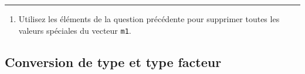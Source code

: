 \documentclass[12pt,twosided, notitlepage]{book}
\newenvironment{Shaded}{}{}
\newcommand{\KeywordTok}[1]{\textcolor[rgb]{0.00,0.00,1.00}{{#1}}}
\newcommand{\StringTok}[1]{\textcolor[rgb]{0.00,0.50,0.50}{{#1}}}
\newcommand{\CommentTok}[1]{\textcolor[rgb]{0.00,0.50,0.00}{{#1}}}
\newcommand{\NormalTok}[1]{{#1}}
\providecommand{\tightlist}{%
  \setlength{\itemsep}{0pt}\setlength{\parskip}{0pt}}
\newif \ifsol
\renewenvironment{Shaded}{\begin{snugshade}}{\end{snugshade}}
\begin{document}
\begin{center} \rule{0.5\linewidth}{\linethickness}\end{center}

\bigskip  \fi 

\begin{enumerate}
\def\labelenumi{\alph{enumi}.}
\setcounter{enumi}{1}
\tightlist
\item
  Utilisez les éléments de la question précédente pour supprimer toutes
  les valeurs spéciales du vecteur
  \texttt{m1}.
\end{enumerate}

\ifsol 

\begin{center} \rule{0.5\linewidth}{\linethickness}\end{center}

\begin{Shaded}
\begin{Highlighting}[]
\CommentTok{# On repart des mêmes éléments qu'à la question}
\CommentTok{# précédente, mais cette fois-ci les vecteurs }
\CommentTok{# logiques sont utilisés pour extraire des éléments}
\CommentTok{# du vecteur x}
\NormalTok{!}\KeywordTok{is.na}\NormalTok{(m1)}
  \NormalTok{##  [1]  TRUE  TRUE FALSE FALSE  TRUE  TRUE  TRUE  TRUE  TRUE FALSE}
  \NormalTok{## [11] FALSE  TRUE FALSE  TRUE}
\NormalTok{m1[!}\KeywordTok{is.na}\NormalTok{(m1)]}
  \NormalTok{## [1]    1    2    5    6  Inf    8    9 -Inf   14}

\NormalTok{!}\KeywordTok{is.infinite}\NormalTok{(m1)}
  \NormalTok{##  [1]  TRUE  TRUE  TRUE  TRUE  TRUE  TRUE FALSE  TRUE  TRUE  TRUE}
  \NormalTok{## [11]  TRUE FALSE  TRUE  TRUE}
\NormalTok{m1[!}\KeywordTok{is.infinite}\NormalTok{(m1)]}
  \NormalTok{##  [1]   1   2  NA NaN   5   6   8   9  NA  NA NaN  14}

\CommentTok{# On n'a qu'à combiner les deux expressions pour }
\CommentTok{# obtenir le résultat souhaité}
\NormalTok{m1[!}\KeywordTok{is.na}\NormalTok{(m1) &}\StringTok{ }\NormalTok{!}\KeywordTok{is.infinite}\NormalTok{(m1) ]}
  \NormalTok{## [1]  1  2  5  6  8  9 14}
\end{Highlighting}
\end{Shaded}

\begin{center} \rule{0.5\linewidth}{\linethickness}\end{center}

\bigskip  \fi 

\subsection{Conversion de type et type
facteur}\label{conversion-de-type-et-type-facteur}
\end{document}
